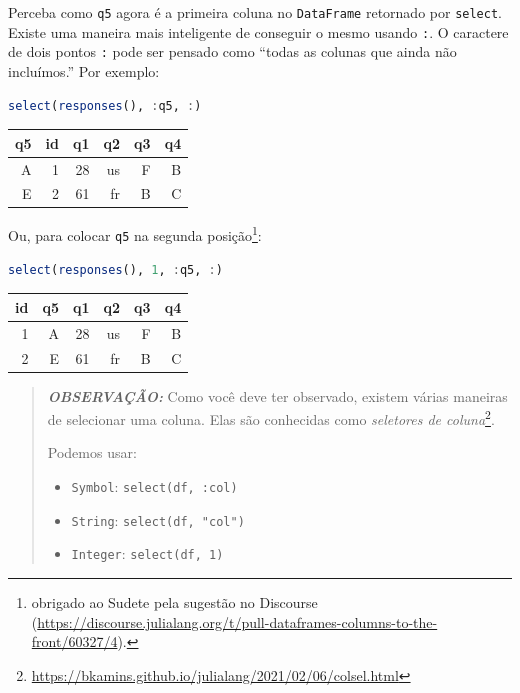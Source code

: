 \documentclass[
  notoc %
]{tufte-book}
\DeclareRobustCommand{\href}[2]{#2\footnote{\url{#1}}}
\newcommand{\passthrough}[1]{#1}
\begin{document}
Perceba como \passthrough{\lstinline!q5!} agora é a primeira coluna no
\passthrough{\lstinline!DataFrame!} retornado por
\passthrough{\lstinline!select!}. Existe uma maneira mais inteligente de
conseguir o mesmo usando \passthrough{\lstinline!:!}. O caractere de
dois pontos \passthrough{\lstinline!:!} pode ser pensado como ``todas as
colunas que ainda não incluímos.'' Por exemplo:

\begin{lstlisting}[language=Julia]
select(responses(), :q5, :)
\end{lstlisting}

\begin{longtable}[]{@{}rrrrrr@{}}
\toprule
q5 & id & q1 & q2 & q3 & q4 \\
\midrule
\endhead
A & 1 & 28 & us & F & B \\
E & 2 & 61 & fr & B & C \\
\bottomrule
\end{longtable}

Ou, para colocar \passthrough{\lstinline!q5!} na segunda
posição\footnote{obrigado ao Sudete pela sugestão no Discourse
  (\url{https://discourse.julialang.org/t/pull-dataframes-columns-to-the-front/60327/4}).}:

\begin{lstlisting}[language=Julia]
select(responses(), 1, :q5, :)
\end{lstlisting}

\begin{longtable}[]{@{}rrrrrr@{}}
\toprule
id & q5 & q1 & q2 & q3 & q4 \\
\midrule
\endhead
1 & A & 28 & us & F & B \\
2 & E & 61 & fr & B & C \\
\bottomrule
\end{longtable}

\begin{quote}
\textbf{\emph{OBSERVAÇÃO:}} Como você deve ter observado, existem várias
maneiras de selecionar uma coluna. Elas são conhecidas como
\href{https://bkamins.github.io/julialang/2021/02/06/colsel.html}{\emph{seletores
de coluna}}.

Podemos usar:

\begin{itemize}
\item
  \passthrough{\lstinline!Symbol!}:
  \passthrough{\lstinline!select(df, :col)!}
\item
  \passthrough{\lstinline!String!}:
  \passthrough{\lstinline!select(df, "col")!}
\item
  \passthrough{\lstinline!Integer!}:
  \passthrough{\lstinline!select(df, 1)!}
\end{itemize}
\end{quote}
\end{document}
